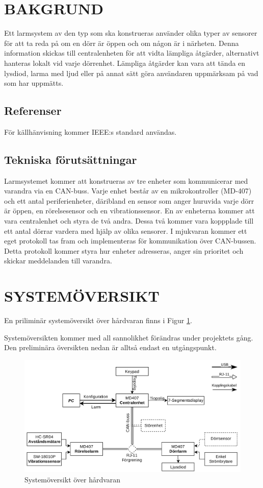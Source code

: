 \documentclass[a4paper]{article}
\begin{document}
\section{BAKGRUND}
\label{sec:bakgrund}

Ett larmsystem av den typ som ska konstrueras använder olika typer av sensorer för att ta reda på om en dörr är öppen och om någon är i närheten. Denna information skickas till centralenheten för att vidta lämpliga åtgärder, alternativt hanteras lokalt vid varje dörrenhet.
Lämpliga åtgärder kan vara att tända en lysdiod, larma med ljud eller på annat sätt göra användaren uppmärksam på vad som har uppmätts.

\subsection{Referenser}
\label{sec:referenser}
För källhänvisning kommer IEEE:s standard användas.

\subsection{Tekniska förutsättningar}
\label{sec:tekniskaf}
Larmsystemet kommer att konstrueras av tre enheter som kommunicerar med varandra via en CAN-buss. Varje enhet består av en mikrokontroller (MD-407) och ett antal periferienheter, däribland en sensor som anger huruvida varje dörr är öppen, en rörelsesensor och en vibrationssensor. En av enheterna kommer att vara centralenhet och styra de två andra. Dessa två kommer vara koppplade till ett antal dörrar vardera med hjälp av olika sensorer.
I mjukvaran kommer ett eget protokoll tas fram och implementeras för kommunikation över CAN-bussen. Detta protokoll kommer styra hur enheter adresseras, anger sin prioritet och skickar meddelanden till varandra.



\section{SYSTEMÖVERSIKT}
\label{sec:systemö}
En priliminär systemöversikt över hårdvaran finns i Figur \ref{fig:hardware}.

Systemöversikten kommer med all sannolikhet förändras under projektets gång. Den preliminära översikten nedan är alltså endast en utgångspunkt.
\begin{figure}[!ht]
	\includegraphics[width=1\textwidth]{figurer/Systemoversikt.jpg}
	\caption{Systemöversikt över hårdvaran}
	\label{fig:hardware}
\end{figure}
\end{document}
